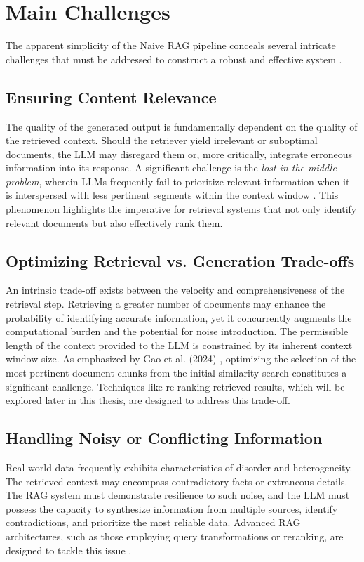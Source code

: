 \section{Main Challenges}
The apparent simplicity of the Naive RAG pipeline conceals several intricate challenges that must be addressed to construct a robust and effective system \autocite{gao2024retrievalaugmentedgenerationlargelanguage}.

\subsection{Ensuring Content Relevance}
The quality of the generated output is fundamentally dependent on the quality of the retrieved context. Should the retriever yield irrelevant or suboptimal documents, the LLM may disregard them or, more critically, integrate erroneous information into its response. A significant challenge is the \textit{lost in the middle problem}, wherein LLMs frequently fail to prioritize relevant information when it is interspersed with less pertinent segments within the context window \autocite{liu2023lostmiddlelanguagemodels}. This phenomenon highlights the imperative for retrieval systems that not only identify relevant documents but also effectively rank them.

\subsection{Optimizing Retrieval vs. Generation Trade-offs}
An intrinsic trade-off exists between the velocity and comprehensiveness of the retrieval step. Retrieving a greater number of documents may enhance the probability of identifying accurate information, yet it concurrently augments the computational burden and the potential for noise introduction. The permissible length of the context provided to the LLM is constrained by its inherent context window size. As emphasized by Gao et al. (2024) \autocite{gao2024retrievalaugmentedgenerationlargelanguage}, optimizing the selection of the most pertinent document chunks from the initial similarity search constitutes a significant challenge. Techniques like re-ranking retrieved results, which will be explored later in this thesis, are designed to address this trade-off.

\subsection{Handling Noisy or Conflicting Information}
Real-world data frequently exhibits characteristics of disorder and heterogeneity. The retrieved context may encompass contradictory facts or extraneous details. The RAG system must demonstrate resilience to such noise, and the LLM must possess the capacity to synthesize information from multiple sources, identify contradictions, and prioritize the most reliable data. Advanced RAG architectures, such as those employing query transformations or reranking, are designed to tackle this issue \autocite{gao2024retrievalaugmentedgenerationlargelanguage, Rackauckas_2024}.

